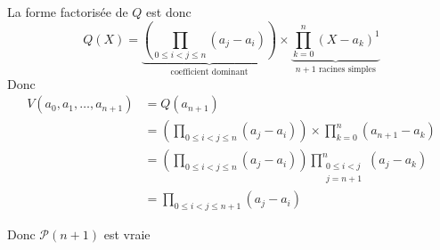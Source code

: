 \documentclass{article}
\begin{document}
\begin{question_kholle}
\begin{itemize}[label=$\lozenge$]
\begin{itemize}
			            La forme factorisée de $Q$ est donc
			            $$
				            Q(X)=\underbrace{ \left( \prod_{0\leqslant i < j \leqslant n} (a_{j}-a_{i})\right) }_{ \text{coefficient dominant} } \times \underbrace{ \prod_{k=0}^{n}(X-a_{k})^{1} }_{ n+1 \text{ racines simples} }
			            $$
			            Donc
			            \begin{align*}
				            V(a_{0}, a_{1},\dots, a_{n+1}) & =Q(a_{n+1})                                                                                                \\
				                                           & =  \left( \prod_{0\leqslant i < j \leqslant n} (a_{j}-a_{i})\right) \times  \prod_{k=0}^{n}(a_{n+1}-a_{k}) \\
				                                           & = \left( \prod_{0\leqslant i < j \leqslant n} (a_{j}-a_{i})\right) \prod_{\substack{0\leqslant i<j         \\ j=n+1}}^{n}(a_{j}-a_{k}) \\
				                                           & = \prod_{0\leqslant i < j \leqslant n+1} (a_{j}-a_{i})
			            \end{align*}

			            Donc $\mathcal{P}(n+1)$ est vraie
		      \end{itemize}
	\end{itemize}
\end{question_kholle}
\end{document}
